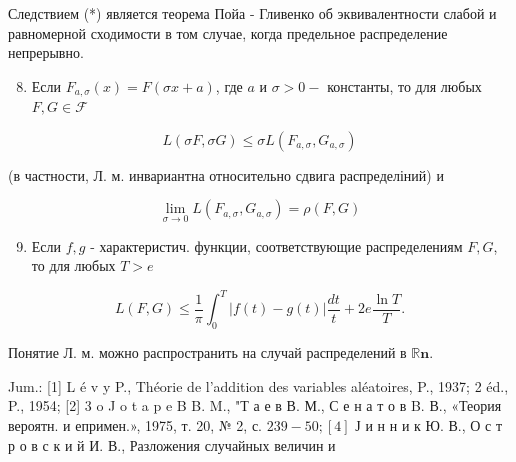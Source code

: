 \documentclass[10pt]{article}
\begin{document}
Следствием (*) является теорема Пойа - Гливенко об эквивалентности слабой и равномерной сходимости в том случае, когда предельное распределение непрерывно.



\begin{enumerate}

  \setcounter{enumi}{7}

  \item Если $F_{a, \sigma}(x)=F(\sigma x+a)$, где $a$ и $\sigma>0-$ константы, то для любых $F, G \in \mathscr{F}$

\end{enumerate}



\[

L(\sigma F, \sigma G) \leqslant \sigma L\left(F_{a, \sigma}, G_{a, \sigma}\right)

\]



(в частности, Л. м. инвариантна относительно сдвига распределіний) и



\[

\lim _{\sigma \rightarrow 0} L\left(F_{a, \sigma}, G_{a, \sigma}\right)=\rho(F, G)

\]



\begin{enumerate}

  \setcounter{enumi}{8}

  \item Если $f, g$ - характеристич. функции, соответствующие распределениям $F, G$, то для любых $T>e$

\end{enumerate}



\[

L(F, G) \leqslant \frac{1}{\pi} \int_{0}^{T}|f(t)-g(t)| \frac{d t}{t}+2 e \frac{\ln T}{T} .

\]



Понятие Л. м. можно распространить на случай распределений в $\mathbb{R} \boldsymbol{n}$.



Jum.: [1] L é v y P., Théorie de l'addition des variables aléatoires, P., 1937; 2 éd., P., 1954; [2] 3 o J o t a p e B B. M., "Т а е в В. М., С е н а т о в B. В., «Теория вероятн. и епримен.», 1975, т. 20, № 2, с. $239-50 ;[4]$ Ј и н н и к Ю. В., О с т р о в с к и й И. В., Разложения случайных величин и
\end{document}
